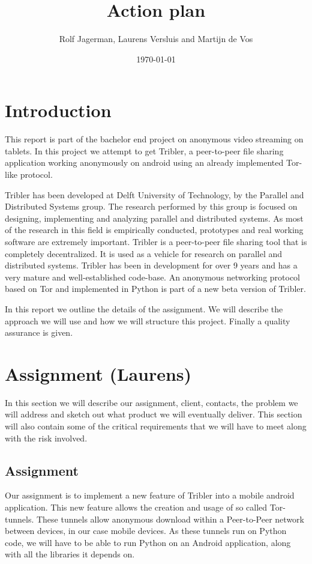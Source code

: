 \documentclass{article}
\title{Action plan}
\author{Rolf Jagerman, Laurens Versluis and Martijn de Vos}
\date{\today}
\begin{document}
\maketitle

\section{Introduction}
This report is part of the bachelor end project on anonymous video streaming on tablets. In this project we attempt to get Tribler, a peer-to-peer file sharing application working anonymously on android using an already implemented Tor-like protocol.

Tribler has been developed at Delft University of Technology, by the Parallel and Distributed Systems group. The research performed by this group is focused on designing, implementing and analyzing parallel and distributed systems. As most of the research in this field is empirically conducted, prototypes and real working software are extremely important. Tribler is a peer-to-peer file sharing tool that is completely decentralized. It is used as a vehicle for research on parallel and distributed systems. Tribler has been in development for over 9 years and has a very mature and well-established code-base. An anonymous networking protocol based on Tor and implemented in Python is part of a new beta version of Tribler.

In this report we outline the details of the assignment. We will describe the approach we will use and how we will structure this project. Finally a quality assurance is given.

\section{Assignment (Laurens)}
In this section we will describe our assignment, client, contacts, the problem we will address and sketch out what product we will eventually deliver. This section will also contain some of the critical requirements that we will have to meet along with the risk involved.

\subsection{Assignment}
Our assignment is to implement a new feature of Tribler into a mobile android application. This new feature allows the creation and usage of so called Tor-tunnels. These tunnels allow anonymous download within a Peer-to-Peer network between devices, in our case mobile devices.
As these tunnels run on Python code, we will have to be able to run Python on an Android application, along with all the libraries it depends on.
\end{document}
